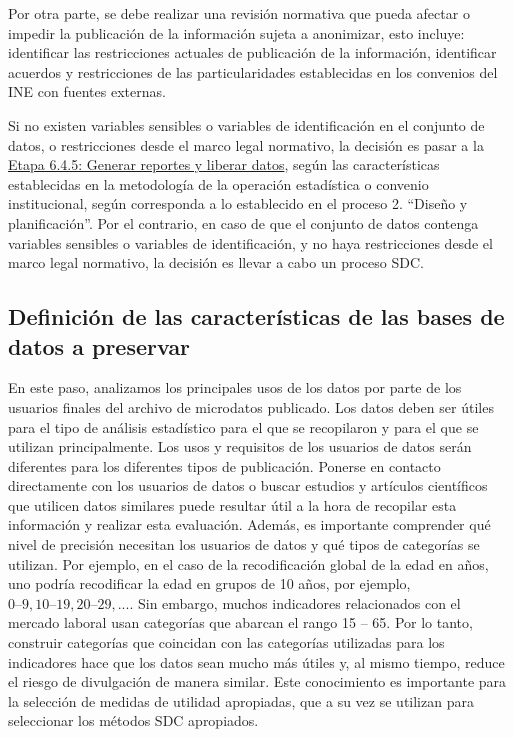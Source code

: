 \documentclass[]{book}
\theoremstyle{definition}
\theoremstyle{definition}
\theoremstyle{definition}
\theoremstyle{definition}
\theoremstyle{remark}
\begin{document}
Por otra parte, se debe realizar una revisión normativa que pueda afectar o impedir la publicación de la información sujeta a anonimizar, esto incluye: identificar las restricciones actuales de publicación de la información, identificar acuerdos y restricciones de las particularidades establecidas en los convenios del INE con fuentes externas.

Si no existen variables sensibles o variables de identificación en el conjunto de datos, o restricciones desde el marco legal normativo, la decisión es pasar a la \protect\hyperlink{etapa-6.4.5-generar-reportes-y-liberar-datos}{Etapa 6.4.5: Generar reportes y liberar datos}, según las características establecidas en la metodología de la operación estadística o convenio institucional, según corresponda a lo establecido en el proceso 2. ``Diseño y planificación''. Por el contrario, en caso de que el conjunto de datos contenga variables sensibles o variables de identificación, y no haya restricciones desde el marco legal normativo, la decisión es llevar a cabo un proceso SDC.

\hypertarget{definiciuxf3n-de-las-caracteruxedsticas-de-las-bases-de-datos-a-preservar}{%
\subsection{Definición de las características de las bases de datos a preservar}\label{definiciuxf3n-de-las-caracteruxedsticas-de-las-bases-de-datos-a-preservar}}

En este paso, analizamos los principales usos de los datos por parte de los usuarios finales del archivo de microdatos publicado. Los datos deben ser útiles para el tipo de análisis estadístico para el que se recopilaron y para el que se utilizan principalmente. Los usos y requisitos de los usuarios de datos serán diferentes para los diferentes tipos de publicación. Ponerse en contacto directamente con los usuarios de datos o buscar estudios y artículos científicos que utilicen datos similares puede resultar útil a la hora de recopilar esta información y realizar esta evaluación. Además, es importante comprender qué nivel de precisión necesitan los usuarios de datos y qué tipos de categorías se utilizan. Por ejemplo, en el caso de la recodificación global de la edad en años, uno podría recodificar la edad en grupos de 10 años, por ejemplo, \(0 – 9, 10 – 19, 20 – 29, ...\). Sin embargo, muchos indicadores relacionados con el mercado laboral usan categorías que abarcan el rango 15 -- 65. Por lo tanto, construir categorías que coincidan con las categorías utilizadas para los indicadores hace que los datos sean mucho más útiles y, al mismo tiempo, reduce el riesgo de divulgación de manera similar. Este conocimiento es importante para la selección de medidas de utilidad apropiadas, que a su vez se utilizan para seleccionar los métodos SDC apropiados.
\end{document}
